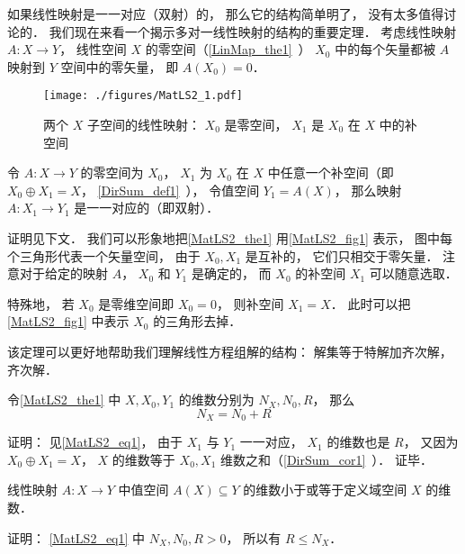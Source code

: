 

如果线性映射是一一对应（双射）的， 那么它的结构简单明了， 没有太多值得讨论的． 我们现在来看一个揭示多对一线性映射的结构的重要定理． 考虑线性映射 $A:X\to Y$， 线性空间 $X$ 的零空间（\autoref{LinMap_the1}~） $X_0$ 中的每个矢量都被 $A$ 映射到 $Y$ 空间中的零矢量， 即 $A(X_0) = \qty{0}$．

\begin{figure}[ht]
\centering
\texttt{[image: ./figures/MatLS2\_1.pdf]}
\caption{两个 $X$ 子空间的线性映射： $X_0$ 是零空间， $X_1$ 是 $X_0$ 在 $X$ 中的补空间} \label{MatLS2_fig1}
\end{figure}

\begin{theorem}{}\label{MatLS2_the1}
令 $A:X \to Y$ 的零空间为 $X_0$， $X_1$ 为 $X_0$ 在 $X$ 中任意一个补空间（即 $X_0\oplus X_1 = X$， \autoref{DirSum_def1}~）， 令值空间 $Y_1 = A(X)$， 那么映射 $A:X_1\to Y_1$ 是一一对应的（即双射）．
\end{theorem}
证明见下文． 我们可以形象地把\autoref{MatLS2_the1} 用\autoref{MatLS2_fig1} 表示， 图中每个三角形代表一个矢量空间， 由于 $X_0, X_1$ 是互补的， 它们只相交于零矢量． 注意对于给定的映射 $A$， $X_0$ 和 $Y_1$ 是确定的， 而 $X_0$ 的补空间 $X_1$ 可以随意选取．

特殊地， 若 $X_0$ 是零维空间即 $X_0 = \qty{0}$， 则补空间 $X_1 = X$． 此时可以把\autoref{MatLS2_fig1} 中表示 $X_0$ 的三角形去掉．

该定理可以更好地帮助我们理解线性方程组解的结构： 解集等于特解加齐次解， 齐次解．

\begin{corollary}{}
令\autoref{MatLS2_the1} 中 $X, X_0, Y_1$ 的维数分别为 $N_X, N_0, R$， 那么
\begin{equation}\label{MatLS2_eq1}
N_X = N_0 + R
\end{equation}
\end{corollary}
证明： 见\autoref{MatLS2_eq1}， 由于 $X_1$ 与 $Y_1$ 一一对应， $X_1$ 的维数也是 $R$， 又因为 $X_0\oplus X_1 = X$， $X$ 的维数等于 $X_0, X_1$ 维数之和（\autoref{DirSum_cor1}~）． 证毕．

\begin{corollary}{}
线性映射 $A:X\to Y$ 中值空间 $A(X) \subseteq Y$ 的维数小于或等于定义域空间 $X$ 的维数．
\end{corollary}
证明： \autoref{MatLS2_eq1} 中 $N_X, N_0, R > 0$， 所以有 $R \leqslant N_X$．

